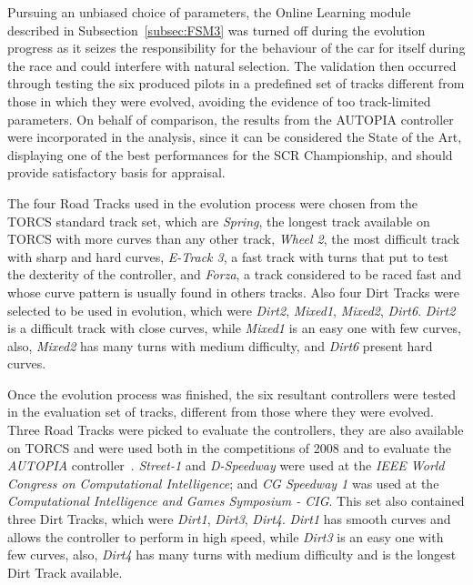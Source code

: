 	Pursuing an unbiased choice of parameters, the Online Learning module described in Subsection~\ref{subsec:FSM3} was turned off during the evolution progress as it seizes the responsibility for the behaviour of the car for itself during the race and could interfere with natural selection. The validation then occurred through testing the six produced pilots in a predefined set of tracks different from those in which they were evolved, avoiding the evidence of too track-limited parameters. On behalf of comparison, the results from the AUTOPIA controller were incorporated in the analysis, since it can be considered the State of the Art, displaying one of the best performances for the SCR Championship, and should provide satisfactory basis for appraisal.

	The four Road Tracks used in the evolution process were chosen from the TORCS standard track set, which are \emph{Spring}, the longest track available on TORCS with more curves than any other track, \emph{Wheel 2}, the most difficult track with sharp and hard curves, \emph{E-Track 3}, a fast track with turns that put to test the dexterity of the controller, and \emph{Forza}, a track considered to be raced fast and whose curve pattern is usually found in others tracks. Also four Dirt Tracks were selected to be used in evolution, which were \emph{Dirt2}, \emph{Mixed1}, \emph{Mixed2}, \emph{Dirt6}. \emph{Dirt2} is a difficult track with close curves, while \emph{Mixed1} is an easy one with few curves, also, \emph{Mixed2} has many turns with medium difficulty, and \emph{Dirt6} present hard curves.
	
	Once the evolution process was finished, the six resultant controllers were tested in the evaluation set of tracks, different from those where they were evolved. Three Road Tracks were picked to evaluate the controllers, they are also available on TORCS and were used both in the competitions of 2008 and to evaluate the \emph{AUTOPIA} controller~\cite{AUTOPIA2009}. \emph{Street-1} and \emph{D-Speedway} were used at the \emph{IEEE World Congress on Computational Intelligence}; and \emph{CG Speedway 1} was used at the \emph{Computational Intelligence and Games Symposium - CIG}. This set also contained three Dirt Tracks, which were \emph{Dirt1}, \emph{Dirt3}, \emph{Dirt4}. \emph{Dirt1} has smooth curves and allows the controller to perform in high speed, while \emph{Dirt3} is an easy one with few curves, also, \emph{Dirt4} has many turns with medium difficulty and is the longest Dirt Track available.
	  
